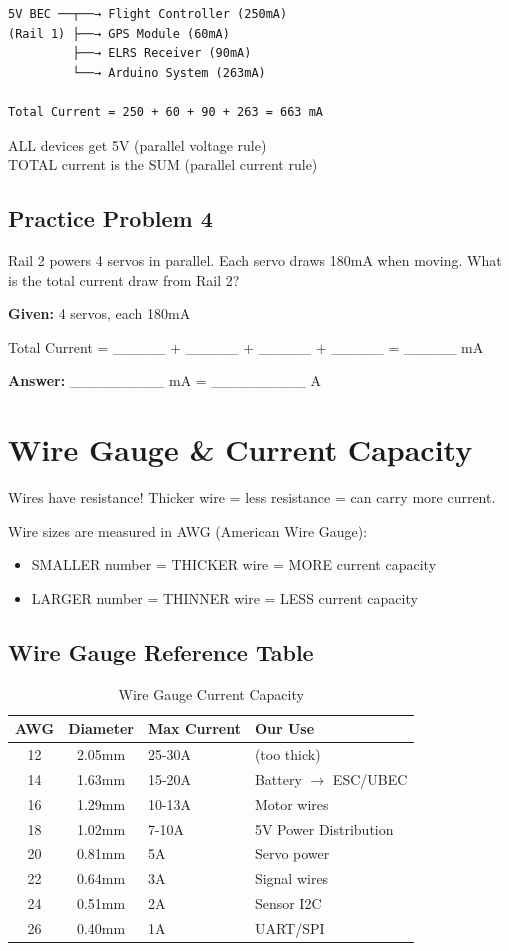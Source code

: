 \documentclass[11pt,letterpaper]{article}
\begin{document}
\begin{verbatim}
5V BEC ──┬──→ Flight Controller (250mA)
(Rail 1) ├──→ GPS Module (60mA)
         ├──→ ELRS Receiver (90mA)
         └──→ Arduino System (263mA)

Total Current = 250 + 60 + 90 + 263 = 663 mA
\end{verbatim}

ALL devices get 5V (parallel voltage rule)\\
TOTAL current is the SUM (parallel current rule)

\subsection{Practice Problem 4}

Rail 2 powers 4 servos in parallel. Each servo draws 180mA when moving. What is the total current draw from Rail 2?

\textbf{Given:} 4 servos, each 180mA

Total Current = \_\_\_\_\_ + \_\_\_\_\_ + \_\_\_\_\_ + \_\_\_\_\_ = \_\_\_\_\_ mA

\textbf{Answer:} \_\_\_\_\_\_\_\_\_ mA = \_\_\_\_\_\_\_\_\_ A

\section{Wire Gauge \& Current Capacity}

Wires have resistance! Thicker wire = less resistance = can carry more current.

Wire sizes are measured in AWG (American Wire Gauge):
\begin{itemize}
  \item SMALLER number = THICKER wire = MORE current capacity
  \item LARGER number = THINNER wire = LESS current capacity
\end{itemize}

\subsection{Wire Gauge Reference Table}

\begin{table}[H]
\centering
\begin{tabular}{ccll}
\toprule
\textbf{AWG} & \textbf{Diameter} & \textbf{Max Current} & \textbf{Our Use} \\
\midrule
12 & 2.05mm & 25-30A & (too thick) \\
14 & 1.63mm & 15-20A & Battery $\rightarrow$ ESC/UBEC \\
16 & 1.29mm & 10-13A & Motor wires \\
18 & 1.02mm & 7-10A & 5V Power Distribution \\
20 & 0.81mm & 5A & Servo power \\
22 & 0.64mm & 3A & Signal wires \\
24 & 0.51mm & 2A & Sensor I2C \\
26 & 0.40mm & 1A & UART/SPI \\
\bottomrule
\end{tabular}
\caption{Wire Gauge Current Capacity}
\end{table}
\end{document}
